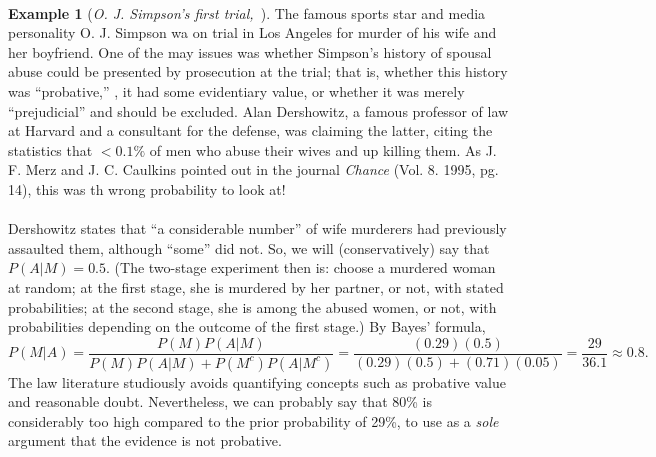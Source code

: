\documentclass[12pt,a4paper]{article}
\theoremstyle{definition}
\newtheorem{example}{Example}[section]
\theoremstyle{definition}
\theoremstyle{definition}
\theoremstyle{definition}
\theoremstyle{remark}
\theoremstyle{definition}
\newcommand{\ie}{\text{i.e.}}
\begin{document}
\
\begin{example}[\it O. J. Simpson's first trial,\ ]
	The famous sports star and media personality O. J. Simpson wa on trial in Los Angeles for murder of his wife and her boyfriend. One of the may issues was whether Simpson's history of spousal abuse could be presented by prosecution at the trial; that is, whether this history was ``probative,'' \ie, it had some evidentiary value, or whether it was merely ``prejudicial'' and should be excluded. Alan Dershowitz, a famous professor of law at Harvard and a consultant for the defense, was claiming the latter, citing the statistics that $<0.1\%$ of men who abuse their wives and up killing them. As J. F. Merz and J. C. Caulkins pointed out in the journal \textit{Chance} (Vol. 8. 1995, pg. 14), this was th wrong probability to look at!\\
	\\
	Dershowitz states that ``a considerable number'' of wife murderers had previously assaulted them, although ``some'' did not. So, we will (conservatively) say that $P(A|M)=0.5$. (The two-stage experiment then is: choose a murdered woman at random; at the first stage, she is murdered by her partner, or not, with stated probabilities; at the second stage, she is among the abused women, or not, with probabilities depending on the outcome of the first stage.) By Bayes' formula, \[
	P(M|A)=\frac{P(M)P(A|M)}{P(M)P(A|M)+P(M^c)P(A|M^c)}=\frac{(0.29)(0.5)}{(0.29)(0.5)+(0.71)(0.05)}=\frac{29}{36.1}\approx0.8.
	\] The law literature studiously avoids quantifying concepts such as probative value and reasonable doubt. Nevertheless, we can probably say that 80\% is considerably too high compared to the prior probability of 29\%, to use as a \textit{sole} argument that the evidence is not probative.
\end{example}
\end{document}

